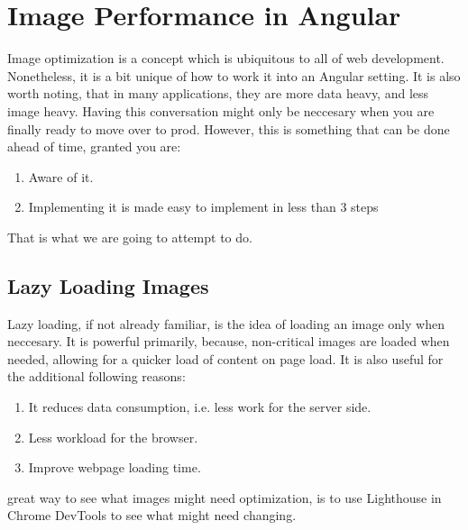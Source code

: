 \chapter{ Image Performance in Angular }

Image optimization is a concept which is ubiquitous to all of web development.
Nonetheless, it is a bit unique of how to work it into an Angular setting. It 
is also worth noting, that in many applications, they are more data heavy, and 
less image heavy. Having this conversation might only be neccesary when you 
are finally ready to move over to prod. However, this is something that can be 
done ahead of time, granted you are: 
\begin{enumerate}
  \item Aware of it. 
  \item Implementing it is made easy to implement in less than 3 steps
\end{enumerate}

That is what we are going to attempt to do. 

\section{Lazy Loading Images}
Lazy loading, if not already familiar, is the idea of loading an image only
when neccesary. It is powerful primarily, because, non-critical images are 
loaded when needed, allowing for a quicker load of content on page load. It 
is also useful for the additional following reasons: 
\begin{enumerate}
  \item It reduces data consumption, i.e. less work for the server side.
  \item Less workload for the browser. 
  \item Improve webpage loading time.
\end{enumerate}

great way to see what images might need optimization, is to use Lighthouse 
in Chrome DevTools to see what might need changing. 

